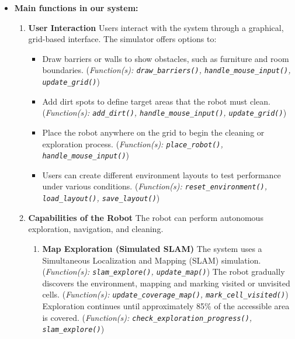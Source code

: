 \documentclass[12pt,a4paper]{report}
\begin{document}
\begin{itemize}
\begin{itemize}
    \item \textbf{Main functions in our system:}
    \begin{enumerate}
    \item \textbf{User Interaction}
    Users interact with the system through a graphical, grid-based interface. The simulator offers options to:
    \begin{itemize}[label={$\rightarrow$}]
        \item Draw barriers or walls to show obstacles, such as furniture and room boundaries.
        (\textit{Function(s): \texttt{draw\_barriers()}, \texttt{handle\_mouse\_input()}, \texttt{update\_grid()}})
        \item Add dirt spots to define target areas that the robot must clean.
        (\textit{Function(s): \texttt{add\_dirt()}, \texttt{handle\_mouse\_input()}, \texttt{update\_grid()}})
        \item Place the robot anywhere on the grid to begin the cleaning or exploration process.
        (\textit{Function(s): \texttt{place\_robot()}, \texttt{handle\_mouse\_input()}})
        \item Users can create different environment layouts to test performance under various conditions.
        (\textit{Function(s): \texttt{reset\_environment()}, \texttt{load\_layout()}, \texttt{save\_layout()}})
    \end{itemize}

    \item \textbf{Capabilities of the Robot}
    The robot can perform autonomous exploration, navigation, and cleaning.
    \begin{enumerate}[label=\alph*.]
        \item \textbf{Map Exploration (Simulated SLAM)}
        The system uses a Simultaneous Localization and Mapping (SLAM) simulation.
        (\textit{Function(s): \texttt{slam\_explore()}, \texttt{update\_map()}})
        The robot gradually discovers the environment, mapping and marking visited or unvisited cells.
        (\textit{Function(s): \texttt{update\_coverage\_map()}, \texttt{mark\_cell\_visited()}})
        Exploration continues until approximately 85\% of the accessible area is covered.
        (\textit{Function(s): \texttt{check\_exploration\_progress()}, \texttt{slam\_explore()}})


\end{enumerate}
\end{enumerate}
\end{itemize}
\end{itemize}
\end{document}
\end{itemize}
\end{itemize}
\end{itemize}
\end{itemize}
\end{document}
